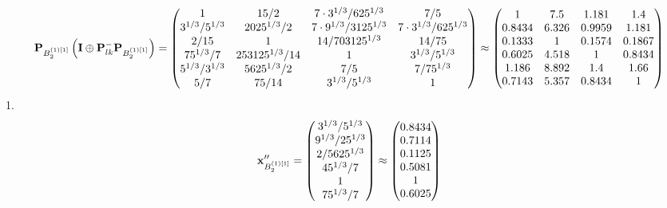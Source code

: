 \documentclass[10pt,a4paper]{article}
\begin{document}
	\[
		\bold{P}_{B_2^{(1)[1]}}\left(\bold{I} \oplus \bold{P}_{lk}^{-}\bold{P}_{B_2^{(1)[1]}}\right) = 
		\begin{pmatrix}
			{1}{} & {{15}} / {{2}} & {{7} \cdot {3^ {1 / 3}}} / {{625^ {1 / 3}}} & {{7}} / {{5}} \\
			{{3^ {1 / 3}}} / {{5^ {1 / 3}}} & {{2025^ {1 / 3}}} / {{2}} & {{7} \cdot {9^ {1 / 3}}} / {{3125^ {1 / 3}}} & {{7} \cdot {3^ {1 / 3}}} / {{625^ {1 / 3}}} \\
			{{2}} / {{15}} & {1}{} & {{14}} / {{703125^ {1 / 3}}} & {{14}} / {{75}} \\
			{{75^ {1 / 3}}} / {{7}} & {{253125^ {1 / 3}}} / {{14}} & {1}{} & {{3^ {1 / 3}}} / {{5^ {1 / 3}}} \\
			{{5^ {1 / 3}}} / {{3^ {1 / 3}}} & {{5625^ {1 / 3}}} / {{2}} & {{7}} / {{5}} & {{7}} / {{75^ {1 / 3}}} \\
			{{5}} / {{7}} & {{75}} / {{14}} & {{3^ {1 / 3}}} / {{5^ {1 / 3}}} & {1}{} \\
		\end{pmatrix}
		\approx
		\begin{pmatrix}
			1        & 7.5      & 1.181    & 1.4      \\
			0.8434   & 6.326    & 0.9959   & 1.181    \\
			0.1333   & 1        & 0.1574   & 0.1867   \\
			0.6025   & 4.518    & 1        & 0.8434   \\
			1.186    & 8.892    & 1.4      & 1.66     \\
			0.7143   & 5.357    & 0.8434   & 1        \\
		\end{pmatrix}
	\]
	1.
	\[
		\bold{x}''_{B_2^{(1)[1]}} = 
		\begin{pmatrix}
			{{3^ {1 / 3}}} / {{5^ {1 / 3}}} \\
			{{9^ {1 / 3}}} / {{25^ {1 / 3}}} \\
			{{2}} / {{5625^ {1 / 3}}} \\
			{{45^ {1 / 3}}} / {{7}} \\
			{1}{} \\
			{{75^ {1 / 3}}} / {{7}} \\
		\end{pmatrix}
		\approx
		\begin{pmatrix}
			0.8434   \\
			0.7114   \\
			0.1125   \\
			0.5081   \\
			1        \\
			0.6025   \\
		\end{pmatrix}
	\]
\end{document}
